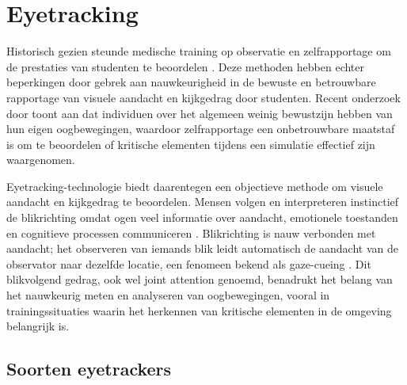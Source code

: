 \section{Eyetracking}

Historisch gezien steunde medische training op observatie en zelfrapportage om de prestaties van studenten te beoordelen \autocite{PAUSZEK2023100031}. 
Deze methoden hebben echter beperkingen door gebrek aan nauwkeurigheid in de bewuste en betrouwbare rapportage van visuele aandacht en kijkgedrag door studenten.
Recent onderzoek door \textcite{Alasdair2017} toont aan dat individuen over het algemeen weinig bewustzijn hebben van hun eigen oogbewegingen, 
waardoor zelfrapportage een onbetrouwbare maatstaf is om te beoordelen of kritische elementen tijdens een simulatie effectief zijn waargenomen.
\newline \par
Eyetracking-technologie biedt daarentegen een objectieve methode om visuele aandacht en kijkgedrag te beoordelen. 
Mensen volgen en interpreteren instinctief de blikrichting omdat ogen veel informatie over aandacht, emotionele toestanden en cognitieve processen communiceren \autocite{Frischen2007}.
Blikrichting is nauw verbonden met aandacht; het observeren van iemands blik leidt automatisch de aandacht van de observator naar dezelfde locatie, een fenomeen bekend als gaze-cueing \autocite{Frischen2007}.
Dit blikvolgend gedrag, ook wel joint attention genoemd, benadrukt het belang van het nauwkeurig meten en analyseren van oogbewegingen, vooral in trainingssituaties waarin het herkennen van kritische elementen in de omgeving belangrijk is.

\subsection{Soorten eyetrackers}


